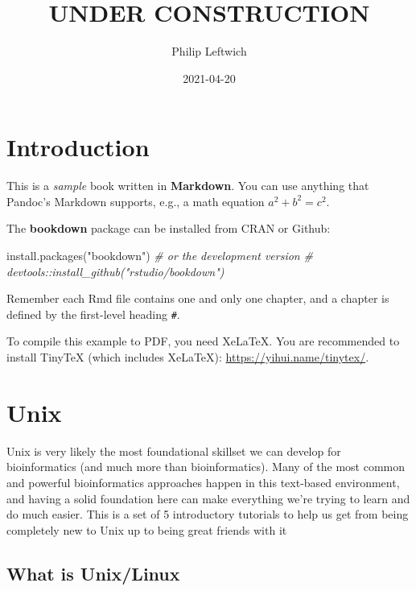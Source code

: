 \documentclass[
]{book}
\title{UNDER CONSTRUCTION}
\author{Philip Leftwich}
\date{2021-04-20}
\newenvironment{Shaded}{\begin{snugshade}}{\end{snugshade}}
\newcommand{\CommentTok}[1]{\textcolor[rgb]{0.56,0.35,0.01}{\textit{#1}}}
\newcommand{\FunctionTok}[1]{\textcolor[rgb]{0.00,0.00,0.00}{#1}}
\newcommand{\NormalTok}[1]{#1}
\newcommand{\StringTok}[1]{\textcolor[rgb]{0.31,0.60,0.02}{#1}}
\begin{document}
\maketitle

{
\setcounter{tocdepth}{1}
\tableofcontents
}
\hypertarget{introduction}{%
\chapter{Introduction}\label{introduction}}

This is a \emph{sample} book written in \textbf{Markdown}. You can use anything that Pandoc's Markdown supports, e.g., a math equation \(a^2 + b^2 = c^2\).

The \textbf{bookdown} package can be installed from CRAN or Github:

\begin{Shaded}
\begin{Highlighting}[]
\FunctionTok{install.packages}\NormalTok{(}\StringTok{"bookdown"}\NormalTok{)}
\CommentTok{\# or the development version}
\CommentTok{\# devtools::install\_github("rstudio/bookdown")}
\end{Highlighting}
\end{Shaded}

Remember each Rmd file contains one and only one chapter, and a chapter is defined by the first-level heading \texttt{\#}.

To compile this example to PDF, you need XeLaTeX. You are recommended to install TinyTeX (which includes XeLaTeX): \url{https://yihui.name/tinytex/}.

\hypertarget{Unix}{%
\chapter{Unix}\label{Unix}}

Unix is very likely the most foundational skillset we can develop for bioinformatics (and much more than bioinformatics). Many of the most common and powerful bioinformatics approaches happen in this text-based environment, and having a solid foundation here can make everything we're trying to learn and do much easier. This is a set of 5 introductory tutorials to help us get from being completely new to Unix up to being great friends with it 🙂

\hypertarget{what-is-unixlinux}{%
\section{What is Unix/Linux}\label{what-is-unixlinux}}
\end{document}
